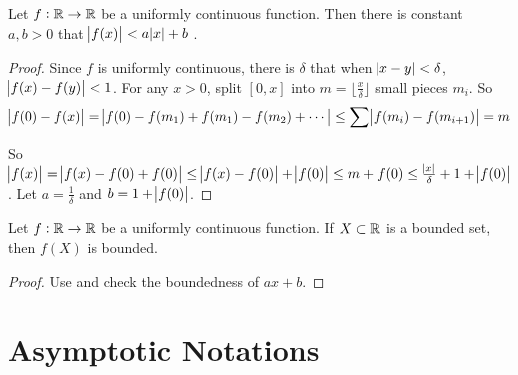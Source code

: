 \begin{theorem}\label{uniform_on_r_with_linear_function}
    Let $f:\mathbb{R} \rightarrow \mathbb{R}$ be a uniformly continuous function. Then there is constant $a,b >0$ that $\abs{f(x)} < a \abs{x} + b$    .
\end{theorem}
\begin{proof}
    Since $f$ is uniformly continuous, there is $\delta$ that when $\abs{x-y} < \delta$, $\abs{f(x) - f(y)} < 1$. For any $x > 0$, split $[0,x]$ into $m = \lfloor \frac{x}{\delta} \rfloor$ small pieces $m_i$. So
    \begin{equation*}
        \abs{f(0) - f(x)} = \abs{f(0) - f(m_1) + f(m_1) - f(m_2) + \cdots} \leq \sum \abs{f(m_i) - f(m_{i+1})} = m
    \end{equation*}
    
    So $\abs{f(x)} = \abs{f(x) - f(0) + f(0)} \leq \abs{f(x) - f(0)} + \abs{f(0)} \leq m + f(0) \leq \frac{\abs{x}}{\delta} + 1 + \abs{f(0)}$. Let $a = \frac{1}{\delta}$ and $b = 1 + \abs{f(0)}$.
\end{proof}

\begin{theorem}
    Let $f: \mathbb{R} \rightarrow \mathbb{R}$ be a uniformly continuous function. If $X \subset \mathbb{R}$ is a bounded set, then $f(X)$ is bounded.
\end{theorem}
\begin{proof}
    Use  and check the boundedness of $ax+b$.
\end{proof}




\section{Asymptotic Notations}

